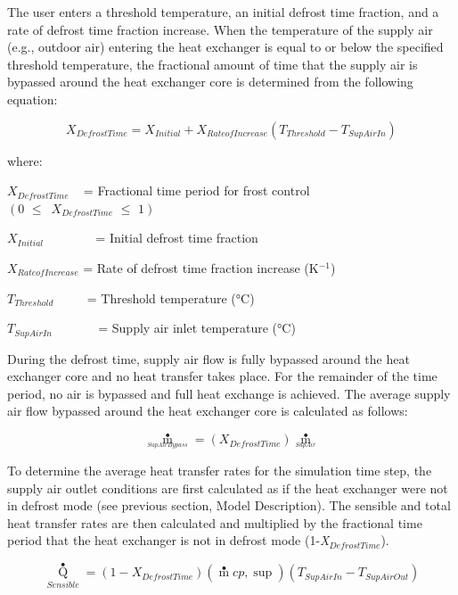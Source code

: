 The user enters a threshold temperature, an initial defrost time fraction, and a rate of defrost time fraction increase. When the temperature of the supply air (e.g., outdoor air) entering the heat exchanger is equal to or below the specified threshold temperature, the fractional amount of time that the supply air is bypassed around the heat exchanger core is determined from the following equation:

\begin{equation}
{X_{DefrostTime}} = {X_{Initial}} + {X_{RateofIncrease}}({T_{Threshold}} - {T_{SupAirIn}})
\end{equation}

where:

\({X_{DefrostTime}}\) ~ = Fractional time period for frost control \(\left( {0\,\, \le \,\,\,{X_{DefrostTime}}\,\, \le \,\,1} \right)\)

\({X_{Initial}}\) ~~~~~~~ = Initial defrost time fraction

\({X_{RateofIncrease}}\) = Rate of defrost time fraction increase (K\(^{-1}\))

\({T_{Threshold}}\) ~~~~ = Threshold temperature (°C)

\({T_{SupAirIn}}\) ~~~~~~ = Supply air inlet temperature (°C)

During the defrost time, supply air flow is fully bypassed around the heat exchanger core and no heat transfer takes place. For the remainder of the time period, no air is bypassed and full heat exchange is achieved. The average supply air flow bypassed around the heat exchanger core is calculated as follows:

\begin{equation}
{\mathop m\limits^ \bullet_{_{SupAirBypass}}} = ({X_{DefrostTime}}){\mathop m\limits^ \bullet_{_{SupAir}}}
\end{equation}

To determine the average heat transfer rates for the simulation time step, the supply air outlet conditions are first calculated as if the heat exchanger were not in defrost mode (see previous section, Model Description). The sensible and total heat transfer rates are then calculated and multiplied by the fractional time period that the heat exchanger is not in defrost mode (1-\emph{X\(_{DefrostTime}\)}).

\begin{equation}
{\mathop Q\limits^ \bullet_{Sensible}} = (1 - {X_{DefrostTime}})\left( {\mathop m\limits^ \bullet  cp,\sup } \right)({T_{SupAirIn}} - {T_{SupAirOut}})
\end{equation}

